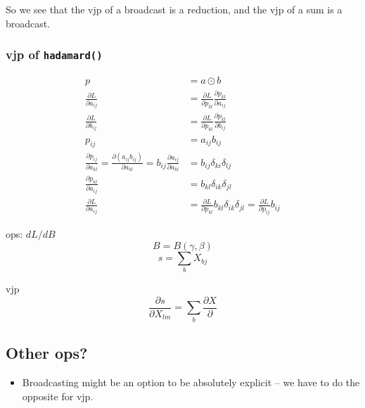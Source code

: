 \documentclass[11pt]{article}
\newcommand{\pd}[2]{\frac{\partial #1}{\partial #2}}
\begin{document}
So we see that the vjp of a broadcast is a reduction, and the vjp of a sum is a
broadcast.

\subsubsection*{vjp of \texttt{hadamard()}}
\begin{align*}
p &= a \odot b\\
\pd{L}{a_{ij}} &= \pd{L}{p_{kl}} \pd{p_{kl}}{a_{ij}} \\
\pd{L}{b_{ij}} &= \pd{L}{p_{kl}} \pd{p_{kl}}{b_{ij}} \\
p_{ij} &= a_{ij} b_{ij}\\
\pd{p_{ij}}{a_{kl}} = \pd{(a_{ij} b_{ij})}{a_{kl}} = b_{ij} \pd{a_{ij}}{a_{kl}} &= b_{ij}\delta_{ki}\delta_{lj} \\
 \pd{p_{kl}}{a_{ij}}  &= b_{kl}\delta_{ik}\delta_{jl} \\
\pd{L}{a_{ij}} &= \pd{L}{p_{kl}} b_{kl} \delta_{ik}\delta_{jl} = \pd{L}{p_{ij}} b_{ij}
\end{align*}

ops: $dL/dB$
\[
B = B(\gamma, \beta)
\]
\[
s = \sum_b X_{bj}
\]

vjp
\[
\frac{\partial s }{\partial X_{lm}} = \sum_b \frac{\partial X}{\partial}
\]

\subsection{Other ops?}
\begin{itemize}
  \item Broadcasting might be an option to be absolutely explicit -- we have to
        do the opposite for vjp.
\end{itemize}
\end{document}
